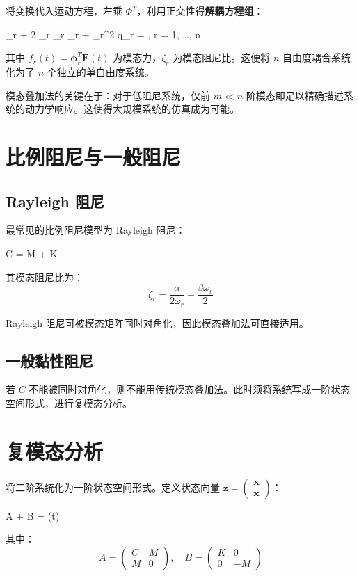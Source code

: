 将变换代入运动方程，左乘 $\Phi^T$，利用正交性得\textbf{解耦方程组}：
\begin{myformula}
	_r + 2 \zeta_r \omega_r _r + \omega_r^2 q_r = , \quad r = 1, \ldots, n
\end{myformula}
其中 $f_r(t) = \boldsymbol{\phi}_r^T \mathbf{F}(t)$ 为模态力，$\zeta_r$ 为模态阻尼比。这便将 $n$ 自由度耦合系统化为了 $n$ 个独立的单自由度系统。

\begin{remark}
	模态叠加法的关键在于：对于低阻尼系统，仅前 $m \ll n$ 阶模态即足以精确描述系统的动力学响应。这使得大规模系统的仿真成为可能。
\end{remark}

\section{比例阻尼与一般阻尼}

\subsection{Rayleigh 阻尼}

最常见的比例阻尼模型为 Rayleigh 阻尼：
\begin{myformula}
	C = \alpha M + \beta K
\end{myformula}
其模态阻尼比为：
\[
\zeta_r = \frac{\alpha}{2\omega_r} + \frac{\beta \omega_r}{2}
\]

\begin{remark}
	Rayleigh 阻尼可被模态矩阵同时对角化，因此模态叠加法可直接适用。
\end{remark}

\subsection{一般黏性阻尼}

若 $C$ 不能被同时对角化，则不能用传统模态叠加法。此时须将系统写成一阶状态空间形式，进行复模态分析。

\section{复模态分析}

将二阶系统化为一阶状态空间形式。定义状态向量 $\mathbf{z} = \begin{pmatrix} \mathbf{x} \\ \dot{\mathbf{x}} \end{pmatrix}$：
\begin{myformula}
	A  + B  = (t)
\end{myformula}
其中：
\[
A = \begin{pmatrix} C & M \\ M & 0 \end{pmatrix}, \quad
B = \begin{pmatrix} K & 0 \\ 0 & -M \end{pmatrix}
\]


